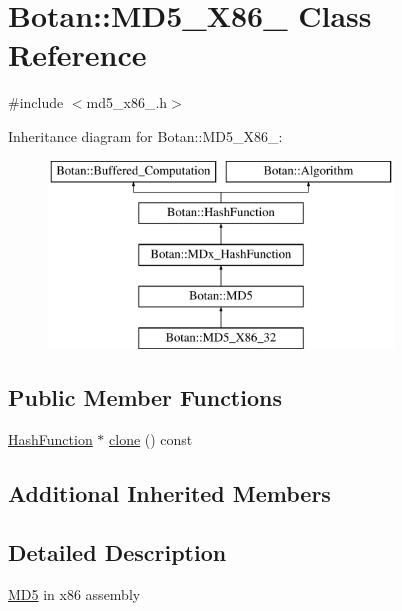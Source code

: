 \hypertarget{classBotan_1_1MD5__X86__32}{\section{Botan\-:\-:M\-D5\-\_\-\-X86\-\_ Class Reference}
\label{classBotan_1_1MD5__X86__32}
}


{\ttfamily \#include $<$md5\-\_\-x86\-\_.\-h$>$}

Inheritance diagram for Botan\-:\-:M\-D5\-\_\-\-X86\-\_\-:\begin{figure}[H]
\begin{center}
\leavevmode
\includegraphics[height=5.000000cm]{classBotan_1_1MD5__X86__32}
\end{center}
\end{figure}
\subsection*{Public Member Functions}
\begin{DoxyCompactItemize}
\item 
\hyperlink{classBotan_1_1HashFunction}{Hash\-Function} $\ast$ \hyperlink{classBotan_1_1MD5__X86__32_a9d12c19a6879bfc3c9c10e9df6d3c2e9}{clone} () const 
\end{DoxyCompactItemize}
\subsection*{Additional Inherited Members}


\subsection{Detailed Description}
\hyperlink{classBotan_1_1MD5}{M\-D5} in x86 assembly 

